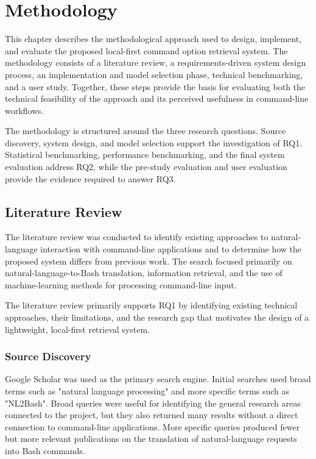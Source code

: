 \section{Methodology}
This chapter describes the methodological approach used to design, implement, and evaluate the proposed local-first command option retrieval system. The methodology consists of a literature review, a requirements-driven system design process, an implementation and model selection phase, technical benchmarking, and a user study. Together, these steps provide the basis for evaluating both the technical feasibility of the approach and its perceived usefulness in command-line workflows.

The methodology is structured around the three research questions. Source discovery, system design, and model selection support the investigation of RQ1. Statistical benchmarking, performance benchmarking, and the final system evaluation address RQ2, while the pre-study evaluation and user evaluation provide the evidence required to answer RQ3.

\subsection{Literature Review}

The literature review was conducted to identify existing approaches to natural-language
interaction with command-line applications and to determine how the proposed system differs from previous work. The search focused primarily on natural-language-to-Bash translation, information retrieval, and the use of machine-learning methods for processing command-line input.

The literature review primarily supports RQ1 by identifying existing technical approaches, their limitations, and the research gap that motivates the design of a lightweight, local-first retrieval system.

\subsubsection{Source Discovery}

Google Scholar was used as the primary search engine. Initial searches used broad terms such as "natural language processing" and more specific terms such as "NL2Bash". Broad queries were useful for identifying the general research areas connected to the project, but they also returned many results without a direct connection to command-line applications. More specific queries produced fewer but more relevant publications on the translation of natural-language requests into Bash commands.

